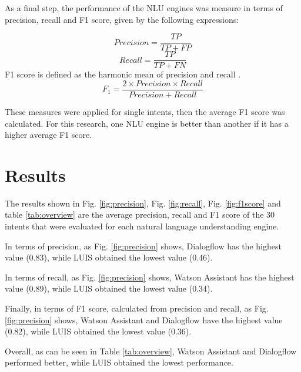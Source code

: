\documentclass[conference]{IEEEtran}
\begin{document}
As a final step, the performance of the NLU engines was measure in terms of precision, recall and F1 score, given by the following expressions:

\begin{equation}
    Precision=\frac{TP}{TP+FP}\label{eq1}
\end{equation}
\begin{equation}
    Recall=\frac{TP}{TP+FN}\label{eq2}
\end{equation}
F1 score is defined as the harmonic mean of precision and recall \cite{campesato2020artificial}.
\begin{equation}
    F_{1} =\frac{2 \times Precision\times Recall}{Precision+Recall}\label{eq3}
\end{equation}

These measures were applied for single intents, then the average F1 score was calculated. For this research, one NLU engine is better than another if it has a higher average F1 score.

\section{Results}

The results shown in Fig. \ref{fig:precision}, Fig. \ref{fig:recall}, Fig. \ref{fig:f1score} and table \ref{tab:overview} are the average precision, recall and F1 score of the 30 intents that were evaluated for each natural language understanding engine.

In terms of precision, as Fig. \ref{fig:precision} shows, Dialogflow has the highest value (0.83), while LUIS obtained the lowest value (0.46).

In terms of recall, as Fig. \ref{fig:precision} shows, Watson Assistant has the highest value (0.89), while LUIS obtained the lowest value (0.34).

Finally, in terms of F1 score, calculated from precision and recall, as Fig. \ref{fig:precision} shows, Watson Assistant and Dialogflow have the highest value (0.82), while LUIS obtained the lowest value (0.36).

Overall, as can be seen in Table \ref{tab:overview}, Watson Assistant and Dialogflow performed better, while LUIS obtained the lowest performance.
\end{document}
